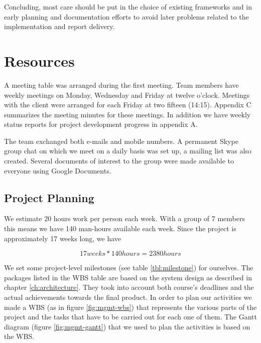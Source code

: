 Concluding, most care should be put in the choice of existing frameworks and in early planning
and documentation efforts to avoid later problems related to the implementation and report delivery.


\section{Resources}
A meeting table was arranged during the first meeting. Team members
have weekly meetings on Monday, Wednesday and Friday at twelve o'clock.
Meetings with the client were arranged for each Friday at two fifteen (14:15).
Appendix C summarizes the meeting minutes for these meetings. In addition we
have weekly status reports for project development progress in appendix A.

The team exchanged both e-mails and mobile numbers. A permanent Skype
group chat on which we meet on a daily basis was set up, a mailing
list was also created. Several documents of interest to the group
were made available to everyone using Google Documents.

\subsection{Project Planning}
We estimate 20 hours work per person each week. With a group of 7 members this means we have
140 man-hours available each week. Since the project is approximately 17 weeks long, we have

\begin{equation}
17 weeks * 140 hours = 2380 hours
\end{equation}

We set some project-level milestones (see table \ref{tbl:milestone}) for ourselves. The packages listed in the 
WBS table are based on the system design as described in chapter \ref{ch:architecture}. They took into 
account both course's deadlines and the actual achievements towards the final product. In order to plan our activities we
made a WBS (as in figure \ref{fig:mgmt-wbs}) that represents the various parts of the project and
the tasks that have to be carried out for each one of them. The Gantt diagram (figure \ref{fig:mgmt-gantt})
that we used to plan the activities is based on the WBS.

